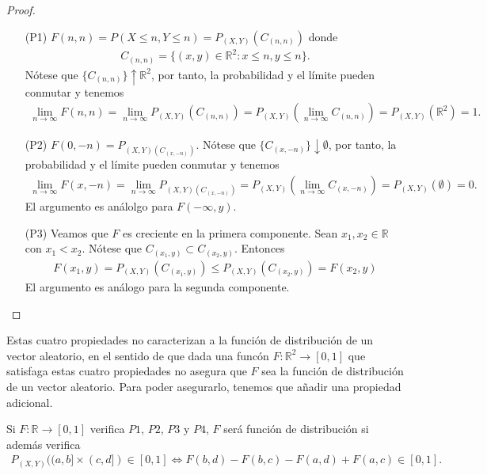 \begin{proof}
    \begin{enumerate}
        \item[(P1)] $F(n,n) = P(X \leq n, Y \leq n) = P_{(X,Y)}(C_{(n,n)})$ donde
              \begin{align*}
                  C_{(n,n)} = \{ (x,y) \in \mathbb{R}^2 : x \leq n, y \leq n\}.
              \end{align*}
              Nótese que $\{C_{(n,n)} \} \uparrow \mathbb{R}^2$, por tanto, la probabilidad y el límite pueden conmutar y tenemos
              \begin{align*}
                  \lim_{n \to \infty}{F(n,n)} = \lim_{n \to \infty}{ P_{(X,Y)}(C_{(n,n)})} = P_{(X,Y)}(\lim_{n \to \infty}{C_{(n,n)}}) = P_{(X,Y)}(\mathbb{R}^2) = 1.
              \end{align*}
        \item[(P2)] $F(0,-n) = P_{(X,Y)(C_{(x,-n)})}$. Nótese que $\{C_{(x,-n)}\} \downarrow \emptyset$, por tanto, la probabilidad y el límite pueden conmutar y tenemos
              \begin{align*}
                  \lim_{n \to \infty}{F(x,-n)} = \lim_{n \to \infty}{P_{(X,Y)(C_{(x,-n)})}} = P_{(X,Y)}{(\lim_{n \to \infty}{C_{(x,-n)}})} = P_{(X,Y)}{(\emptyset)} = 0.
              \end{align*}
              El argumento es análolgo para $F(-\infty,y)$.
        \item[(P3)] Veamos que $F$ es creciente en la primera componente. Sean $x_1, x_2 \in \mathbb{R}$ con $x_1 < x_2$. Nótese que $C_{(x_1,y)} \subset C_{(x_2,y)}$. Entonces
              \begin{align*}
                  F(x_1,y) = P_{(X,Y)}(C_{(x_1,y)}) \leq P_{(X,Y)}(C_{(x_2,y)}) = F(x_2,y)
              \end{align*}
              El argumento es análogo para la segunda componente.
    \end{enumerate}

\end{proof}

\begin{obs}
    Estas cuatro propiedades no caracterizan a la función de distribución de un vector aleatorio, en el sentido de que dada una funcón $F: \mathbb{R}^2 \longrightarrow [0,1]$ que satisfaga estas cuatro propiedades no asegura que $F$ sea la función de distribución de un vector aleatorio. Para poder asegurarlo, tenemos que añadir una propiedad adicional.

    Si $F: \mathbb{R} \longrightarrow [0,1]$ verifica $P1$, $P2$, $P3$ y $P4$, $F$ será función de distribución si además verifica
    \begin{align*}
        P_{(X,Y)}((a,b] \times (c,d]) \in [0,1] \Longleftrightarrow F(b,d) - F(b,c) - F(a,d) + F(a,c) \in [0,1].
    \end{align*}
\end{obs}

